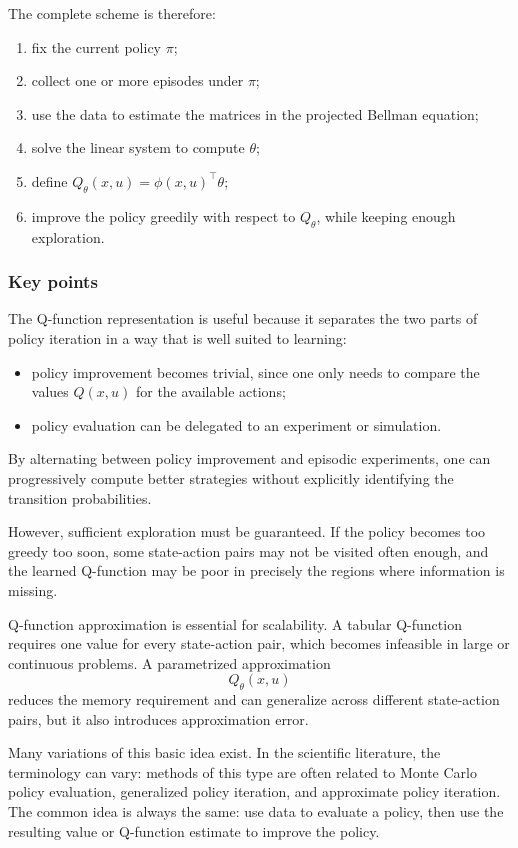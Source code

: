 The complete scheme is therefore:
\begin{enumerate}
    \item fix the current policy \(\pi\);
    \item collect one or more episodes under \(\pi\);
    \item use the data to estimate the matrices in the projected Bellman equation;
    \item solve the linear system to compute \(\theta\);
    \item define \(Q_\theta(x,u)=\phi(x,u)^\top\theta\);
    \item improve the policy greedily with respect to \(Q_\theta\), while keeping enough
    exploration.
\end{enumerate}

\subsubsection{Key points}

The Q-function representation is useful because it separates the two parts of policy iteration in
a way that is well suited to learning:
\begin{itemize}
    \item policy improvement becomes trivial, since one only needs to compare the values
    \(Q(x,u)\) for the available actions;
    \item policy evaluation can be delegated to an experiment or simulation.
\end{itemize}

By alternating between policy improvement and episodic experiments, one can progressively
compute better strategies without explicitly identifying the transition probabilities.

However, sufficient exploration must be guaranteed. If the policy becomes too greedy too soon,
some state-action pairs may not be visited often enough, and the learned Q-function may be
poor in precisely the regions where information is missing.

Q-function approximation is essential for scalability. A tabular Q-function requires one value
for every state-action pair, which becomes infeasible in large or continuous problems. A
parametrized approximation
\[
Q_\theta(x,u)
\]
reduces the memory requirement and can generalize across different state-action pairs, but it
also introduces approximation error.

Many variations of this basic idea exist. In the scientific literature, the terminology can vary:
methods of this type are often related to Monte Carlo policy evaluation, generalized policy
iteration, and approximate policy iteration. The common idea is always the same: use data to
evaluate a policy, then use the resulting value or Q-function estimate to improve the policy.